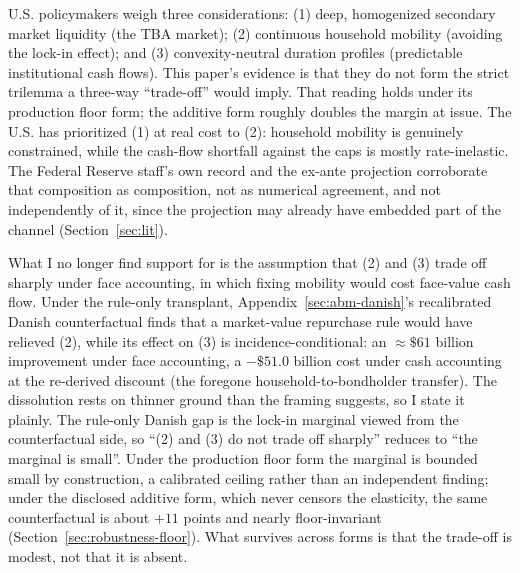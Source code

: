 U.S. policymakers weigh three considerations: (1) deep, homogenized secondary market liquidity (the TBA market); (2) continuous household mobility (avoiding the lock-in effect); and (3) convexity-neutral duration profiles (predictable institutional cash flows). This paper's evidence is that they do not form the strict trilemma a three-way ``trade-off'' would imply. That reading holds under its production floor form; the additive form roughly doubles the margin at issue. The U.S. has prioritized (1) at real cost to (2): household mobility is genuinely constrained, while the cash-flow shortfall against the caps is mostly rate-inelastic. The Federal Reserve staff's own record and the ex-ante projection corroborate that composition as composition, not as numerical agreement, and not independently of it, since the projection may already have embedded part of the channel (Section~\ref{sec:lit}).

What I no longer find support for is the assumption that (2) and (3) trade off sharply under face accounting, in which fixing mobility would cost face-value cash flow. Under the rule-only transplant, Appendix~\ref{sec:abm-danish}'s recalibrated Danish counterfactual finds that a market-value repurchase rule would have relieved (2), while its effect on (3) is incidence-conditional: an $\approx\$61$ billion improvement under face accounting, a $-\$51.0$ billion cost under cash accounting at the re-derived discount (the foregone household-to-bondholder transfer). The dissolution rests on thinner ground than the framing suggests, so I state it plainly. The rule-only Danish gap is the lock-in marginal viewed from the counterfactual side, so ``(2) and (3) do not trade off sharply'' reduces to ``the marginal is small''. Under the production floor form the marginal is bounded small by construction, a calibrated ceiling rather than an independent finding; under the disclosed additive form, which never censors the elasticity, the same counterfactual is about $+11$ points and nearly floor-invariant (Section~\ref{sec:robustness-floor}). What survives across forms is that the trade-off is modest, not that it is absent.

